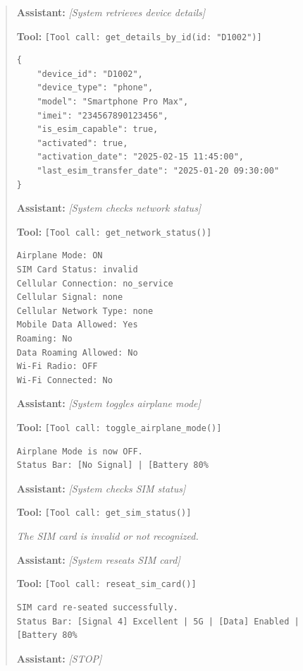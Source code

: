 \begin{quote}
\vspace{0.5em}
\noindent\textbf{Assistant:} \textit{[System retrieves device details]}

\vspace{0.5em}
\noindent\textbf{Tool:} \texttt{[Tool call: get\_details\_by\_id(id: "D1002")]}

\begin{verbatim}
{
    "device_id": "D1002",
    "device_type": "phone",
    "model": "Smartphone Pro Max",
    "imei": "234567890123456",
    "is_esim_capable": true,
    "activated": true,
    "activation_date": "2025-02-15 11:45:00",
    "last_esim_transfer_date": "2025-01-20 09:30:00"
}
\end{verbatim}

\vspace{0.5em}
\noindent\textbf{Assistant:} \textit{[System checks network status]}

\vspace{0.5em}
\noindent\textbf{Tool:} \texttt{[Tool call: get\_network\_status()]}

\begin{verbatim}
Airplane Mode: ON
SIM Card Status: invalid
Cellular Connection: no_service
Cellular Signal: none
Cellular Network Type: none
Mobile Data Allowed: Yes
Roaming: No
Data Roaming Allowed: No
Wi-Fi Radio: OFF
Wi-Fi Connected: No
\end{verbatim}

\vspace{0.5em}
\noindent\textbf{Assistant:} \textit{[System toggles airplane mode]}

\vspace{0.5em}
\noindent\textbf{Tool:} \texttt{[Tool call: toggle\_airplane\_mode()]}

\begin{verbatim}
Airplane Mode is now OFF.
Status Bar: [No Signal] | [Battery 80%
\end{verbatim}

\vspace{0.5em}
\noindent\textbf{Assistant:} \textit{[System checks SIM status]}

\vspace{0.5em}
\noindent\textbf{Tool:} \texttt{[Tool call: get\_sim\_status()]}

\textit{The SIM card is invalid or not recognized.}

\vspace{0.5em}
\noindent\textbf{Assistant:} \textit{[System reseats SIM card]}

\vspace{0.5em}
\noindent\textbf{Tool:} \texttt{[Tool call: reseat\_sim\_card()]}

\begin{verbatim}
SIM card re-seated successfully.
Status Bar: [Signal 4] Excellent | 5G | [Data] Enabled | [Battery 80%
\end{verbatim}

\vspace{0.5em}
\noindent\textbf{Assistant:} \textit{[STOP]}
\end{quote}
